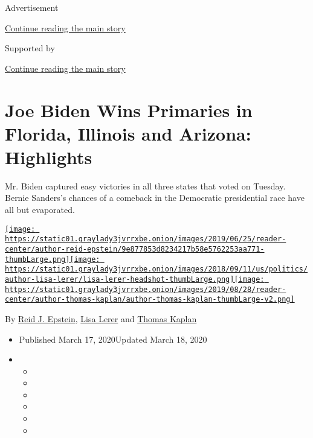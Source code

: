 Advertisement

\protect\hyperlink{after-top}{Continue reading the main story}

Supported by

\protect\hyperlink{after-sponsor}{Continue reading the main story}

\hypertarget{joe-biden-wins-primaries-in-florida-illinois-and-arizona-highlights}{%
\section{Joe Biden Wins Primaries in Florida, Illinois and Arizona:
Highlights}\label{joe-biden-wins-primaries-in-florida-illinois-and-arizona-highlights}}

Mr. Biden captured easy victories in all three states that voted on
Tuesday. Bernie Sanders's chances of a comeback in the Democratic
presidential race have all but evaporated.

\href{https://www.nytimes3xbfgragh.onion/by/reid-j-epstein}{\texttt{[image: https://static01.graylady3jvrrxbe.onion/images/2019/06/25/reader-center/author-reid-epstein/9e877853d8234217b58e5762253aa771-thumbLarge.png]}}\href{https://www.nytimes3xbfgragh.onion/by/lisa-lerer}{\texttt{[image: https://static01.graylady3jvrrxbe.onion/images/2018/09/11/us/politics/author-lisa-lerer/lisa-lerer-headshot-thumbLarge.png]}}\href{https://www.nytimes3xbfgragh.onion/by/thomas-kaplan}{\texttt{[image: https://static01.graylady3jvrrxbe.onion/images/2019/08/28/reader-center/author-thomas-kaplan/author-thomas-kaplan-thumbLarge-v2.png]}}

By \href{https://www.nytimes3xbfgragh.onion/by/reid-j-epstein}{Reid J.
Epstein}, \href{https://www.nytimes3xbfgragh.onion/by/lisa-lerer}{Lisa
Lerer} and
\href{https://www.nytimes3xbfgragh.onion/by/thomas-kaplan}{Thomas
Kaplan}

\begin{itemize}
\item
  Published March 17, 2020Updated March 18, 2020
\item
  \begin{itemize}
  \item
  \item
  \item
  \item
  \item
  \item
  \end{itemize}
\end{itemize}

